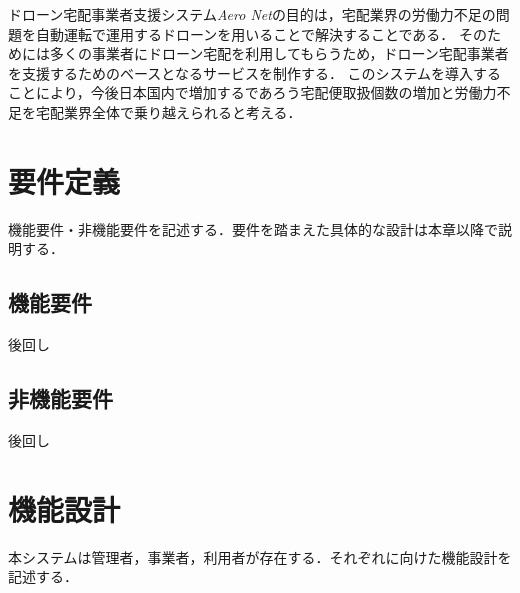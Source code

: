 \documentclass[a4paper, titlepage]{jsarticle}
\newcommand{\system}{\textsl{Aero Net}}
\begin{document}
ドローン宅配事業者支援システム\system の目的は，宅配業界の労働力不足の問題を自動運転で運用するドローンを用いることで解決することである．
そのためには多くの事業者にドローン宅配を利用してもらうため，ドローン宅配事業者を支援するためのベースとなるサービスを制作する．
このシステムを導入することにより，今後日本国内で増加するであろう宅配便取扱個数の増加と労働力不足を宅配業界全体で乗り越えられると考える．

\section{要件定義}
機能要件・非機能要件を記述する．要件を踏まえた具体的な設計は本章以降で説明する．
\subsection{機能要件}
後回し
\subsection{非機能要件}
後回し

\section{機能設計}
本システムは管理者，事業者，利用者が存在する．それぞれに向けた機能設計を記述する．
\end{document}
